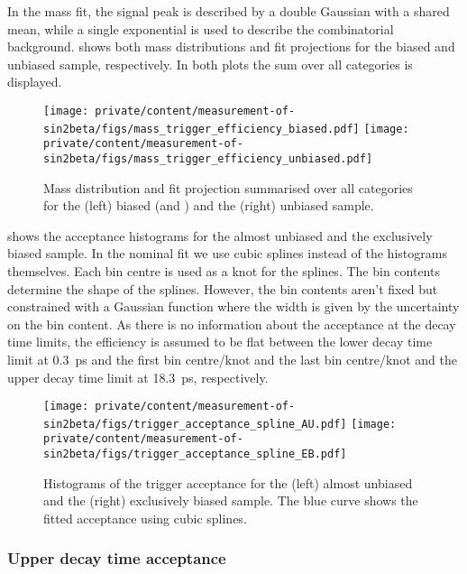 In the mass fit, the signal peak is described by a double Gaussian with a shared
mean, while a single exponential is used to describe the combinatorial
background.  shows both mass distributions and fit projections for the
biased and unbiased sample, respectively. In both plots the sum over all
categories is displayed.
%
\begin{figure}
\texttt{[image: private/content/measurement-of-sin2beta/figs/mass\_trigger\_efficiency\_biased.pdf]}
\texttt{[image: private/content/measurement-of-sin2beta/figs/mass\_trigger\_efficiency\_unbiased.pdf]}
\label{fig:measurement_of_sin2beta:resolution_and_acceptance:acceptance:lower:mass_fits}
\caption{Mass distribution and fit projection summarised over all categories for
the (left) biased (\catAU and \catEB) and the (right) unbiased sample.}
\end{figure}
%
shows the acceptance histograms for the almost unbiased and the exclusively
biased sample. In the nominal fit we use cubic splines
instead of the histograms themselves. Each bin centre is used as a knot for the
splines. The bin contents determine the shape of the splines. However, the bin
contents aren't fixed but constrained with a Gaussian function where the width
is given by the uncertainty on the bin content. As there is no information about
the acceptance at the decay time limits, the efficiency is assumed to be flat
between the lower decay time limit at \SI{0.3}{\ps} and the first bin
centre/knot and the last bin centre/knot and the upper decay time limit at
\SI{18.3}{\ps}, respectively.
%
\begin{figure}
\texttt{[image: private/content/measurement-of-sin2beta/figs/trigger\_acceptance\_spline\_AU.pdf]}
\texttt{[image: private/content/measurement-of-sin2beta/figs/trigger\_acceptance\_spline\_EB.pdf]}
\label{fig:measurement_of_sin2beta:resolution_and_acceptance:acceptance:lower:splines}
\caption{Histograms of the trigger acceptance for the (left) almost unbiased and
the (right) exclusively biased sample. The blue curve shows the fitted
acceptance using cubic splines.}
\end{figure}

\subsubsection{Upper decay time acceptance}
\label{sec:measurement_of_sin2beta:resolution_and_acceptance:acceptance:upper}

